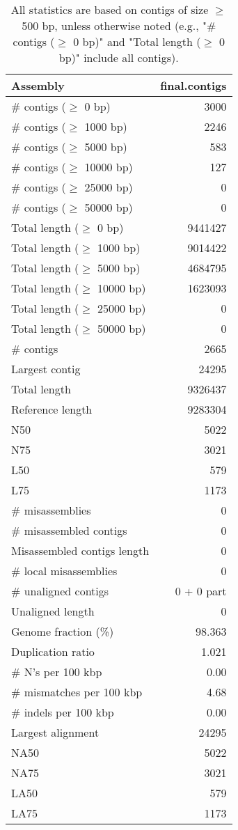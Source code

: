\documentclass[12pt,a4paper]{article}
\begin{document}
\begin{table}[ht]
\begin{center}
\caption{All statistics are based on contigs of size $\geq$ 500 bp, unless otherwise noted (e.g., "\# contigs ($\geq$ 0 bp)" and "Total length ($\geq$ 0 bp)" include all contigs).}
\begin{tabular}{|l*{1}{|r}|}
\hline
Assembly & final.contigs \\ \hline
\# contigs ($\geq$ 0 bp) & 3000 \\ \hline
\# contigs ($\geq$ 1000 bp) & 2246 \\ \hline
\# contigs ($\geq$ 5000 bp) & 583 \\ \hline
\# contigs ($\geq$ 10000 bp) & 127 \\ \hline
\# contigs ($\geq$ 25000 bp) & 0 \\ \hline
\# contigs ($\geq$ 50000 bp) & 0 \\ \hline
Total length ($\geq$ 0 bp) & 9441427 \\ \hline
Total length ($\geq$ 1000 bp) & 9014422 \\ \hline
Total length ($\geq$ 5000 bp) & 4684795 \\ \hline
Total length ($\geq$ 10000 bp) & 1623093 \\ \hline
Total length ($\geq$ 25000 bp) & 0 \\ \hline
Total length ($\geq$ 50000 bp) & 0 \\ \hline
\# contigs & 2665 \\ \hline
Largest contig & 24295 \\ \hline
Total length & 9326437 \\ \hline
Reference length & 9283304 \\ \hline
N50 & 5022 \\ \hline
N75 & 3021 \\ \hline
L50 & 579 \\ \hline
L75 & 1173 \\ \hline
\# misassemblies & 0 \\ \hline
\# misassembled contigs & 0 \\ \hline
Misassembled contigs length & 0 \\ \hline
\# local misassemblies & 0 \\ \hline
\# unaligned contigs & 0 + 0 part \\ \hline
Unaligned length & 0 \\ \hline
Genome fraction (\%) & 98.363 \\ \hline
Duplication ratio & 1.021 \\ \hline
\# N's per 100 kbp & 0.00 \\ \hline
\# mismatches per 100 kbp & 4.68 \\ \hline
\# indels per 100 kbp & 0.00 \\ \hline
Largest alignment & 24295 \\ \hline
NA50 & 5022 \\ \hline
NA75 & 3021 \\ \hline
LA50 & 579 \\ \hline
LA75 & 1173 \\ \hline
\end{tabular}
\end{center}
\end{table}
\end{document}
